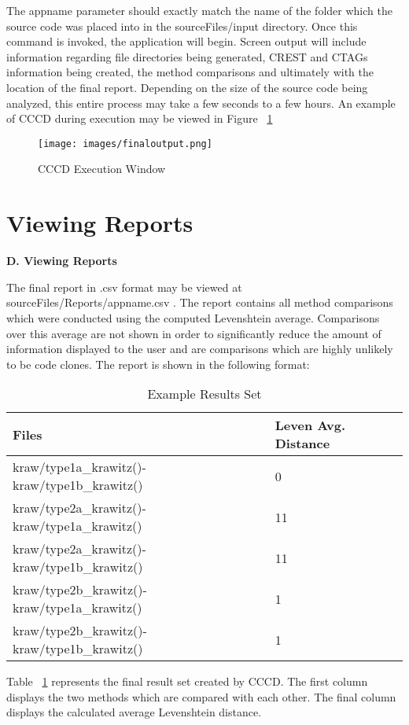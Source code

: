 \documentclass[conference]{IEEEtran}
\begin{document}
The appname parameter should exactly match the name of the folder which the source code was placed into in the sourceFiles/input directory. Once this command is invoked, the application will begin. Screen output will include information regarding file directories being generated, CREST and CTAGs information being created, the method comparisons and ultimately with the location of the final report. Depending on the size of the source code being analyzed, this entire process may take a few seconds to a few hours. An example of CCCD during execution may be viewed in Figure ~\ref{fig:cccdrunning} \\


\begin{figure}[t!]
\centering
\texttt{[image: images/finaloutput.png]}
\caption{CCCD Execution Window}
\label{fig:cccdrunning}
\end{figure}

\section{Viewing Reports}
{\bf D. Viewing Reports} %


The final report in .csv format may be viewed at sourceFiles/Reports/appname.csv . The report contains all method comparisons which were conducted using the computed Levenshtein average. Comparisons over this average are not shown in order to significantly reduce the amount of information displayed to the user and are comparisons which are highly unlikely to be code clones. The report is shown in the following format:



\begin{table}[t!]
\begin{center}
  \begin{tabular}{| l | l |}
    \hline
    Files & Leven Avg. Distance \\ \hline

	kraw/type1a\_krawitz()-kraw/type1b\_krawitz()& 0 \\ \hline
	kraw/type2a\_krawitz()-kraw/type1a\_krawitz()& 11 \\ \hline
	kraw/type2a\_krawitz()-kraw/type1b\_krawitz()& 11 \\ \hline
	kraw/type2b\_krawitz()-kraw/type1a\_krawitz()& 1 \\ \hline
	kraw/type2b\_krawitz()-kraw/type1b\_krawitz()& 1 \\ \hline


    \end{tabular}
\end{center}

\caption{Example Results Set}
\label{table:exampleresults}
\end{table}

Table ~\ref{table:exampleresults} represents the final result set created by CCCD. The first column displays the two methods which are compared with each other. The final column displays the calculated average Levenshtein distance. 




\end{document}
